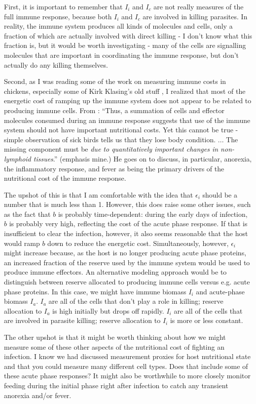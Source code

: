 \documentclass[12pt,reqno,final,pdftex]{amsart}\usepackage[]{graphicx}\usepackage[]{color}
\theoremstyle{plain}
\numberwithin{equation}{part}
\begin{document}
First, it is important to remember that $I_i$ and $I_c$ are not really measures of the full immune response, because both $I_i$ and $I_c$ are involved in killing parasites.
In reality, the immune system produces all kinds of molecules and cells, only a fraction of which are actually involved with direct killing - I don't know what this fraction is, but it would be worth investigating - many of the cells are signalling molecules that are important in coordinating the immune response, but don't actually do any killing themselves.

Second, as I was reading some of the work on measuring immune costs in chickens, especially some of Kirk Klasing's old stuff \citep[e.g., ][]{Klasing1999}, I realized that most of the energetic cost of ramping up the immune system does not appear to be related to producing immune cells.
From \cite{Klasing1999}: ``Thus, a summation of cells and effector molecules consumed during an immune response suggests that use of the immune system should not have important nutritional costs. Yet this cannot be true - simple observation of sick birds tells us that they lose body condition. ... The missing component must be \emph{due to quantitatively important changes in non-lymphoid tissues}.'' (emphasis mine.)
He goes on to discuss, in particular, anorexia, the inflammatory response, and fever as being the primary drivers of the nutritional cost of the immune response.

The upshot of this is that I am comfortable with the idea that $\epsilon_i$ should be a number that is much less than 1.
However, this does raise some other issues, such as the fact that $b$ is probably time-dependent: during the early days of infection, $b$ is probably very high, reflecting the cost of the acute phase response.
If that is insufficient to clear the infection, however, it also seems reasonable that the host would ramp $b$ down to reduce the energetic cost.
Simultaneously, however, $\epsilon_i$ might increase because, as the host is no longer producing acute phase proteins, an increased fraction of the reserve used by the immune system would be used to produce immune effectors.
An alternative modeling approach would be to distinguish between reserve allocated to producing immune cells versus e.g. acute phase proteins.
In this case, we might have immune biomass $I_i$ and acute-phase biomass $I_a$.
$I_a$ are all of the cells that don't play a role in killing; reserve allocation to $I_a$ is high initially but drops off rapidly.
$I_i$ are all of the cells that are involved in parasite killing; reserve allocation to $I_i$ is more or less constant.

The other upshot is that it might be worth thinking about how we might measure some of these other aspects of the nutritional cost of fighting an infection.
I know we had discussed measurement proxies for host nutritional state and that you could measure many different cell types.
Does that include some of these acute phase responses?
It might also be worthwhile to more closely monitor feeding during the initial phase right after infection to catch any transient anorexia and/or fever.





\end{document}

